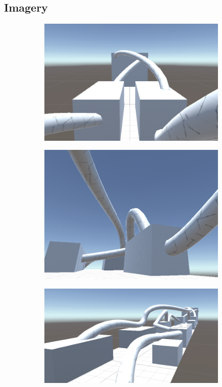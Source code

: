 \documentclass[letterpaper]{report}
\begin{document}
			\subsection{Imagery}
				\begin{figure}[H]
					\begin{subfigure}[h]{.32\linewidth}
						\includegraphics[width=\linewidth]{level2-1}
					\end{subfigure}
					\begin{subfigure}[h]{.32\linewidth}
						\includegraphics[width=\linewidth]{level2-2}
					\end{subfigure}
					\begin{subfigure}[h]{.32\linewidth}
						\includegraphics[width=\linewidth]{level2-3}
					\end{subfigure}
				\end{figure}
\end{document}
